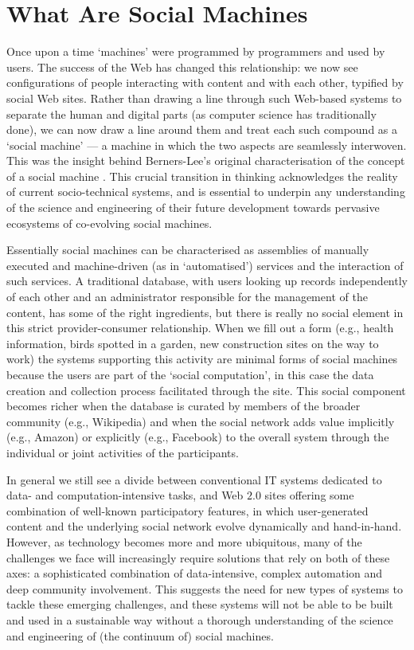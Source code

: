 \documentclass{www13-companion-accepted}
\begin{document}
\section{What Are Social Machines}
Once upon a time `machines' were programmed by programmers and used by users. The success of the Web has changed this relationship: we now see configurations of people interacting with content and with each other, typified by social Web sites. Rather than drawing a line through such Web-based systems to separate the human and digital parts (as computer science has traditionally done), we can now draw a line around them and treat each such compound as a `social machine' --- a machine in which the two aspects are seamlessly interwoven. This was the insight behind Berners-Lee's original characterisation of the concept of a social machine \cite{bernerslee1999}. This crucial transition in thinking acknowledges the reality of current socio-technical systems, and is essential to underpin any understanding of the science and engineering of their future development towards pervasive ecosystems of co-evolving social machines.

Essentially social machines can be characterised as assemblies of manually executed and machine-driven (as in `automatised') services and the interaction of such services. A traditional database, with users looking up records independently of each other and an administrator responsible for the management of the content, has some of the right ingredients, but there is really no social element in this strict provider-consumer relationship. When we fill out a form (e.g., health information, birds spotted in a garden, new construction sites on the way to work) the systems supporting this activity are minimal forms of social machines because the users are part of the `social computation', in this case the data creation and collection process facilitated through the site. This social component becomes richer when the database is curated by members of the broader community (e.g., Wikipedia) and when the social network adds value implicitly (e.g., Amazon) or explicitly (e.g., Facebook) to the overall system through the individual or joint activities of the participants.

In general we still see a divide between conventional IT systems dedicated to data- and computation-intensive tasks, and Web $2.0$ sites offering some combination of well-known participatory features, in which user-generated content and the underlying social network evolve dynamically and hand-in-hand. However, as technology becomes more and more ubiquitous, many of the challenges we face will increasingly require solutions that rely on both of these axes: a sophisticated combination of data-intensive, complex automation and deep community involvement. This suggests the need for new types of systems to tackle these emerging challenges, and these systems will not be able to be built and used in a sustainable way without a thorough understanding of the science and engineering of (the continuum of) social machines.
\end{document}
